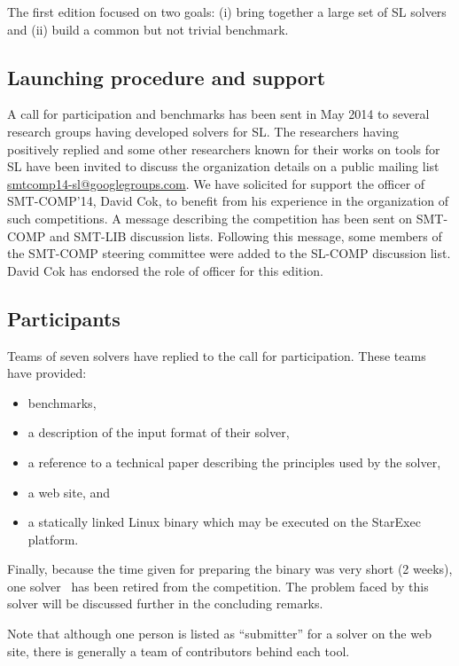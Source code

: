 \documentclass{llncs}
\begin{document}
The first edition focused on two goals:
(i) bring together a large set of SL solvers and
(ii) build a common but not trivial benchmark. 

\subsection{Launching procedure and support}
A call for participation and benchmarks has been sent
in May 2014 %
to several research groups 
having developed solvers for SL.
The researchers having positively replied and some other researchers known for their works on tools for SL have been invited to discuss the organization details on a public mailing list \url{smtcomp14-sl@googlegroups.com}.
We have solicited for support the officer of SMT-COMP'14, David Cok, to benefit from his experience in the organization of such competitions.
A message describing the competition has been sent on SMT-COMP and SMT-LIB discussion lists. Following this message, some members of the SMT-COMP steering committee were added to the SL-COMP discussion list. 
David Cok has endorsed the role of officer for this edition.


\subsection{Participants}
Teams of seven solvers have replied to the call for participation.
These teams have provided:
\begin{itemize}
\item benchmarks, 
\item a description of the input format of their solver, 
\item a reference to a technical paper describing the principles used by the solver, 
\item a web site, and
\item a statically linked Linux binary which may be executed on the StarExec platform.
\end{itemize}
Finally, because the time given for preparing the binary was very short (2 weeks), one solver~\cite{HasseIOP13}
has been retired from the competition. The problem faced by this solver will be discussed further in the concluding remarks.

Note that although one person is listed as ``submitter'' for a solver on the web site,
there is generally a team of contributors behind each tool.
\end{document}
